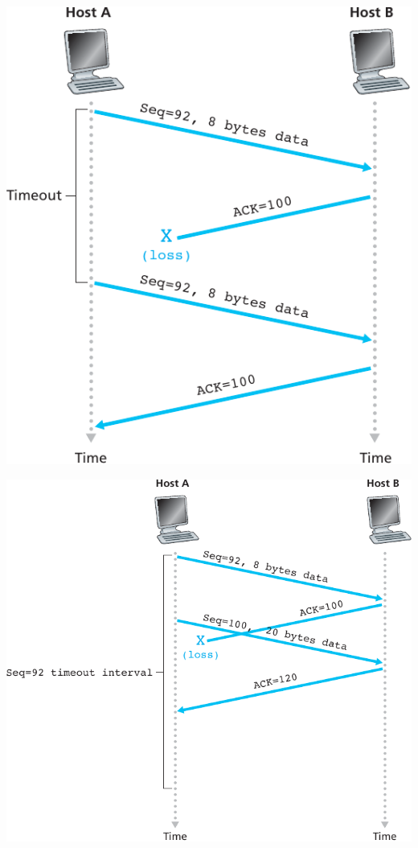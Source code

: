 \begin{minipage}{.42\linewidth}
  \includegraphics[width=\columnwidth]{tcp-ack-lost}  
\end{minipage}\hfill
\begin{minipage}{.56\linewidth}
  \includegraphics[width=\columnwidth]{tcp-ack-lost2}
\end{minipage}

